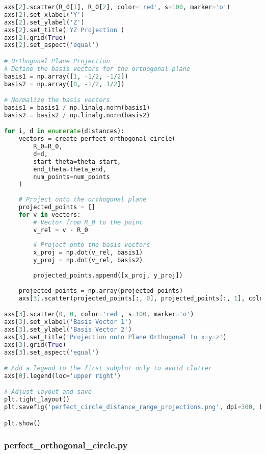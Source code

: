 \begin{lstlisting}[language=Python]
axs[2].scatter(R_0[1], R_0[2], color='red', s=100, marker='o')
axs[2].set_xlabel('Y')
axs[2].set_ylabel('Z')
axs[2].set_title('YZ Projection')
axs[2].grid(True)
axs[2].set_aspect('equal')

# Orthogonal Plane Projection
# Define the basis vectors for the orthogonal plane
basis1 = np.array([1, -1/2, -1/2])
basis2 = np.array([0, -1/2, 1/2])

# Normalize the basis vectors
basis1 = basis1 / np.linalg.norm(basis1)
basis2 = basis2 / np.linalg.norm(basis2)

for i, d in enumerate(distances):
    vectors = create_perfect_orthogonal_circle(
        R_0=R_0,
        d=d,
        start_theta=theta_start,
        end_theta=theta_end,
        num_points=num_points
    )
    
    # Project onto the orthogonal plane
    projected_points = []
    for v in vectors:
        # Vector from R_0 to the point
        v_rel = v - R_0
        
        # Project onto the basis vectors
        x_proj = np.dot(v_rel, basis1)
        y_proj = np.dot(v_rel, basis2)
        
        projected_points.append([x_proj, y_proj])
    
    projected_points = np.array(projected_points)
    axs[3].scatter(projected_points[:, 0], projected_points[:, 1], color=colors[i])

axs[3].scatter(0, 0, color='red', s=100, marker='o')
axs[3].set_xlabel('Basis Vector 1')
axs[3].set_ylabel('Basis Vector 2')
axs[3].set_title('Projection onto Plane Orthogonal to x=y=z')
axs[3].grid(True)
axs[3].set_aspect('equal')

# Add a legend to the first subplot only to avoid clutter
axs[0].legend(loc='upper right')

# Adjust layout and save
plt.tight_layout()
plt.savefig('perfect_circle_distance_range_projections.png', dpi=300, bbox_inches='tight')

plt.show()
\end{lstlisting}

\subsubsection{perfect\_orthogonal\_circle.py}


